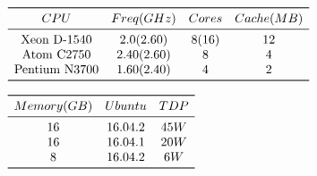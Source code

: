 \begin{table}
\centering
$\begin{array}{*{4}{c}}
	\toprule
		CPU & Freq(GHz) & Cores & Cache(MB)\\
	\midrule
		\text{Xeon D-1540} & 2.0(2.60) & 8(16) & 12 \\
		\text{Atom C2750} & 2.40(2.60) & 8 & 4 \\
		\text{Pentium N3700} & 1.60(2.40) & 4 & 2 \\
	\bottomrule
\end{array}$
\caption{}
\end{table}

\begin{table}
\centering
$\begin{array}{*{4}{c}}
	\toprule
		Memory(GB) & Ubuntu & TDP \\
	\midrule
		16 & 16.04.2 & 45W \\
		16 & 16.04.1 & 20W \\
		8 & 16.04.2 & 6W \\
	\bottomrule
\end{array}$
\caption{}
\end{table}


